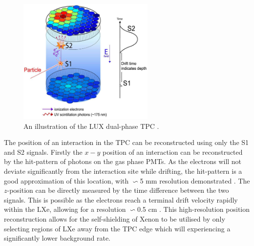 \begin{figure}
    \centering
    \includegraphics[width=0.6\textwidth]{Figures/LZ/tpc_theory.png}
    \caption{An illustration of the LUX dual-phase TPC \cite{lux_ref}.}
    \label{fig:TPC_theory}
\end{figure}

\par
The position of an interaction in the TPC can be reconstructed using only the S1 and S2 signals.
Firstly the $x-y$ position of an interaction can be reconstructed by the hit-pattern of photons on the gas phase PMTs. 
As the electrons will not deviate significantly from the interaction site while drifting, the hit-pattern is a good approximation of this location, with $\backsim$5 mm resolution demonstrated \cite{lux_position_reconstruction_ref}.
The $z$-position can be directly measured by the time difference between the two signals.
This is possible as the electrons reach a terminal drift velocity rapidly within the LXe, allowing for a resolution $\backsim$0.5 cm \cite{LZ_TechnicalDesignReview_ref}.
This high-resolution position reconstruction allows for the self-shielding of Xenon to be utilised by only selecting regions of LXe away from the TPC edge which will experiencing a significantly lower background rate.


